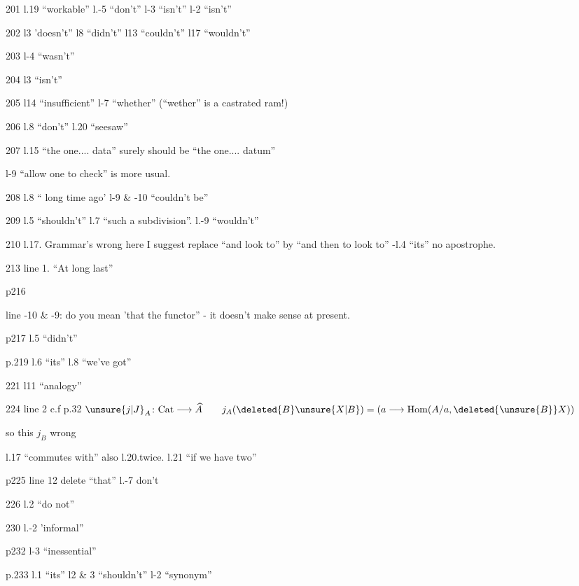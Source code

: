201 l.19 ``workable'' l.-5 ``don't'' l-3 ``isn't'' l-2 ``isn't''

202 l3 'doesn't'' l8 ``didn't'' l13 ``couldn't'' l17 ``wouldn't''

203 l-4 ``wasn't''

204 l3 ``isn't''

205 l14 ``insufficient'' l-7 ``whether'' (``wether'' is a castrated ram!)

206 l.8 ``don't'' l.20 ``seesaw''

207 l.15 ``the one.... data'' surely should be ``the one.... datum''

l-9 ``allow one to check'' is more usual.

208 l.8 `` long time ago' l-9 \& -10 ``couldn't be''

209 l.5 ``shouldn't'' l.\unsure{-}7 ``such a subdivision''. l.-9 ``wouldn't''

210 l.17. Grammar's wrong here I suggest replace ``and look to'' by ``and then to look to'' -l.4 ``its'' no apostrophe.

213 line 1. ``At long last''

p216 

line -10 \& -9: do you mean 'that the functor'' - it doesn't make sense at present.

p217 l.5 ``didn't''

p.219 l.6 ``its'' l.8 ``we've got''

221 l11 ``analogy''

224 line 2 c.f p.32 $\unsure{j|J}_A\colon\mathrm{Cat}\longrightarrow\widehat A\qquad j_A(\deleted{B}\unsure{X|B})=(a\longrightarrow\operatorname{Hom}(A/a,\deleted{\unsure{B}}X))$

so  this  $j_B$   wrong

l.17 ``commutes with'' also l.20.twice. l.21 ``if we have two''


p225 line 12 delete ``that'' l.-7 don't

226 l.2 ``do not''

230 l.-2 'informal''

p232 l-3 ``inessential''

p.233 l.1 ``its'' l2 \& 3 ``shouldn't'' l-2 ``synonym''

